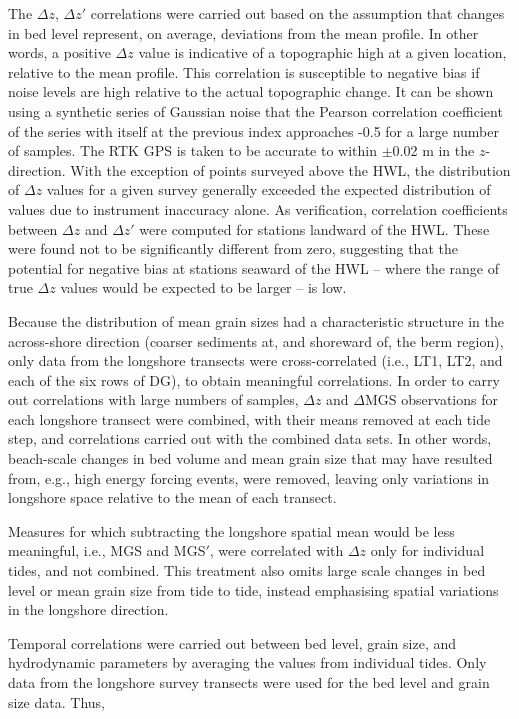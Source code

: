 \documentclass[jmse,article,submit,pdftex,moreauthors]{Definitions/mdpi}
\begin{document}
The $\Delta z$, $\Delta z'$ correlations were carried out based on the assumption that changes in bed level represent, on average, deviations from the mean profile. In other words, a positive $\Delta z$ value is indicative of a topographic high at a given location, relative to the mean profile. This correlation is susceptible to negative bias if noise levels are high relative to the actual topographic change. It can be shown using a synthetic series of Gaussian noise that the Pearson correlation coefficient of the series with itself at the previous index approaches -0.5 for a large number of samples. The RTK GPS is taken to be accurate to within $\pm$0.02 m in the $z$-direction. With the exception of points surveyed above the HWL, the distribution of $\Delta z$ values for a given survey generally exceeded the expected distribution of values due to instrument inaccuracy alone. As verification, correlation coefficients between $\Delta z$ and $\Delta z'$ were computed for stations landward of the HWL. These were found not to be significantly different from zero, suggesting that the potential for negative bias at stations seaward of the HWL -- where the range of true $\Delta z$ values would be expected to be larger -- is low.

Because the distribution of mean grain sizes had a characteristic structure in the across-shore direction (coarser sediments at, and shoreward of, the berm region), only data from the longshore transects were cross-correlated (i.e., LT1, LT2, and each of the six rows of DG), to obtain meaningful correlations. In order to carry out correlations with large numbers of samples, $\Delta z$ and $\Delta$MGS observations for each longshore transect were combined, with their means removed at each tide step, and correlations carried out with the combined data sets. In other words, beach-scale changes in bed volume and mean grain size that may have resulted from, e.g., high energy forcing events, were removed, leaving only variations in longshore space relative to the mean of each transect.

Measures for which subtracting the longshore spatial mean would be less meaningful, i.e., MGS and MGS$'$, were correlated with $\Delta z$ only for individual tides, and not combined. This treatment also omits large scale changes in bed level or mean grain size from tide to tide, instead emphasising spatial variations in the longshore direction.

Temporal correlations were carried out between bed level, grain size, and hydrodynamic parameters by averaging the values from individual tides. Only data from the longshore survey transects were used for the bed level and grain size data. Thus,
\end{document}
